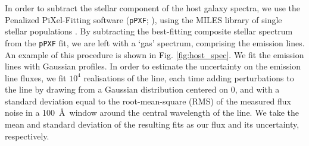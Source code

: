 \documentclass[fleqn,usenatbib,]{mnras}
\begin{document}
In order to subtract the stellar component of the host galaxy spectra, we use the Penalized PiXel-Fitting software (\texttt{pPXF}; \citealt{Cappellari2004,Cappellari2012,Cappellari2017}), using the MILES library of single stellar populations \citep{Vazdekis2010}. By subtracting the best-fitting composite stellar spectrum from the \texttt{pPXF} fit, we are left with a `gas' spectrum, comprising the emission lines. An example of this procedure is shown in Fig. \ref{fig:host_spec}. We fit the emission lines with Gaussian profiles. In order to estimate the uncertainty on the emission line fluxes, we fit $10^4$ realisations of the line, each time adding perturbations to the line by drawing from a Gaussian distribution centered on 0, and with a standard deviation equal to the root-mean-square (RMS) of the measured flux noise in a 100~\AA~window around the central wavelength of the line. We take the mean and standard deviation of the resulting fits as our flux and its uncertainty, respectively.
\end{document}
